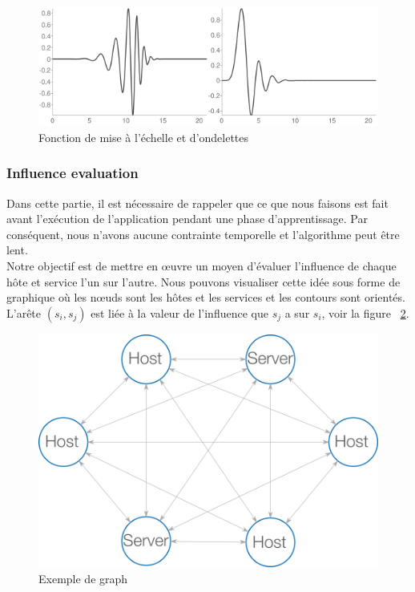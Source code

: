 \documentclass[10pt,a4paper,oneside]{article}
\begin{document}
\begin{figure}[!h]
\centering
\includegraphics[scale=0.67]{./images/PNG/db11.png}
\caption{Fonction de mise à l'échelle et d'ondelettes}
\label{db}
\end{figure}

\begin{multicols}{2}
\subsubsection{Influence evaluation}
Dans cette partie, il est nécessaire de rappeler que ce que nous faisons est fait avant l'exécution de l'application pendant une phase d'apprentissage. Par conséquent, nous n’avons aucune contrainte temporelle et l’algorithme peut être lent.
\\
Notre objectif est de mettre en œuvre un moyen d'évaluer l'influence de chaque hôte et service l'un sur l'autre. Nous pouvons visualiser cette idée sous forme de graphique où les nœuds sont les hôtes et les services et les contours sont orientés. L'arête $(s_i,s_j)$ est liée à la valeur de l'influence que $s_j$ a sur $s_i$, voir la figure ~\ref{graphe}.
\end{multicols}


\begin{figure}[!h]
\centering
\includegraphics[scale=0.6]{./images/PNG/Graphe.png}
\caption{Exemple de graph}
\label{graphe}
\end{figure}
\end{document}
